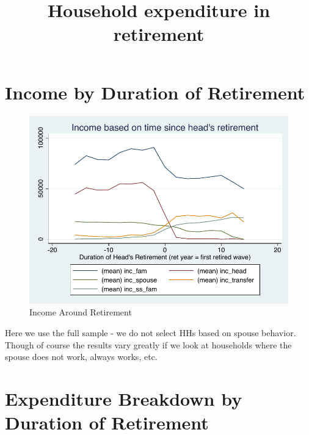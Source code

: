 \documentclass[a4paper]{article}
\begin{document}
	
	\title{Household expenditure in retirement}
	\date{}
	\maketitle

\section{Income by Duration of Retirement}

\begin{figure}[h]
	\caption{Income Around Retirement}
	\centering
	\includegraphics[width=1.0\textwidth]{../IncomeAroundRetirement/Income_with_spouse_definition_1.pdf}
\end{figure}

Here we use the full sample - we do not select HHs based on spouse behavior. Though of course the results vary greatly if we look at households where the spouse does not work, always works, etc. 

\clearpage

\section{Expenditure Breakdown by Duration of Retirement}
\end{document}

